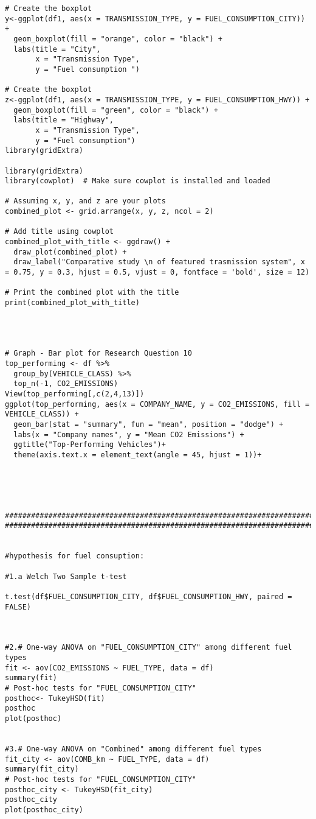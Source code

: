 \documentclass[12pt, a4paper,oneside]{book}
\numberwithin{equation}{section}
\begin{document}
\begin{lstlisting}
# Create the boxplot
y<-ggplot(df1, aes(x = TRANSMISSION_TYPE, y = FUEL_CONSUMPTION_CITY)) +
  geom_boxplot(fill = "orange", color = "black") +
  labs(title = "City",
       x = "Transmission Type",
       y = "Fuel consumption ")

# Create the boxplot
z<-ggplot(df1, aes(x = TRANSMISSION_TYPE, y = FUEL_CONSUMPTION_HWY)) +
  geom_boxplot(fill = "green", color = "black") +
  labs(title = "Highway",
       x = "Transmission Type",
       y = "Fuel consumption")
library(gridExtra)

library(gridExtra)
library(cowplot)  # Make sure cowplot is installed and loaded

# Assuming x, y, and z are your plots
combined_plot <- grid.arrange(x, y, z, ncol = 2)

# Add title using cowplot
combined_plot_with_title <- ggdraw() +
  draw_plot(combined_plot) +
  draw_label("Comparative study \n of featured trasmission system", x = 0.75, y = 0.3, hjust = 0.5, vjust = 0, fontface = 'bold', size = 12)

# Print the combined plot with the title
print(combined_plot_with_title)




# Graph - Bar plot for Research Question 10
top_performing <- df %>% 
  group_by(VEHICLE_CLASS) %>% 
  top_n(-1, CO2_EMISSIONS)
View(top_performing[,c(2,4,13)])
ggplot(top_performing, aes(x = COMPANY_NAME, y = CO2_EMISSIONS, fill = VEHICLE_CLASS)) +
  geom_bar(stat = "summary", fun = "mean", position = "dodge") +
  labs(x = "Company names", y = "Mean CO2 Emissions") +
  ggtitle("Top-Performing Vehicles")+
  theme(axis.text.x = element_text(angle = 45, hjust = 1))+





#########################################################################################################################
##############################################################################################################################


#hypothesis for fuel consuption:

#1.a Welch Two Sample t-test

t.test(df$FUEL_CONSUMPTION_CITY, df$FUEL_CONSUMPTION_HWY, paired = FALSE)



#2.# One-way ANOVA on "FUEL_CONSUMPTION_CITY" among different fuel types
fit <- aov(CO2_EMISSIONS ~ FUEL_TYPE, data = df)
summary(fit)
# Post-hoc tests for "FUEL_CONSUMPTION_CITY"
posthoc<- TukeyHSD(fit)
posthoc
plot(posthoc)


#3.# One-way ANOVA on "Combined" among different fuel types
fit_city <- aov(COMB_km ~ FUEL_TYPE, data = df)
summary(fit_city)
# Post-hoc tests for "FUEL_CONSUMPTION_CITY"
posthoc_city <- TukeyHSD(fit_city)
posthoc_city
plot(posthoc_city)












\end{lstlisting}
\end{document}
